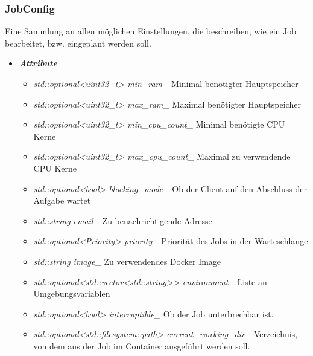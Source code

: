 \documentclass[a4paper,12pt]{article}
\begin{document}
\subsubsection{JobConfig}

Eine Sammlung an allen möglichen Einstellungen, die beschreiben, wie ein Job bearbeitet, bzw. eingeplant werden soll.

\begin{itemize}[label={}]

	\item \textit{\textbf{Attribute}}
		\begin{itemize}[label={\textbullet}]
			\item \textit{std::optional<uint32\_t> min\_ram\_} Minimal benötigter Hauptspeicher
			\item \textit{std::optional<uint32\_t> max\_ram\_} Maximal benötigter Hauptspeicher
			\item \textit{std::optional<uint32\_t> min\_cpu\_count\_} Minimal benötigte CPU Kerne
			\item \textit{std::optional<uint32\_t> max\_cpu\_count\_} Maximal zu verwendende CPU Kerne
			\item \textit{std::optional<bool> blocking\_mode\_} Ob der Client auf den Abschluss der Aufgabe wartet
			\item \textit{std::string email\_} Zu benachrichtigende Adresse
			\item \textit{std::optional<Priority> priority\_} Priorität des Jobs in der Warteschlange
			\item \textit{std::string image\_} Zu verwendendes Docker Image
			\item \textit{std::optional<std::vector<std::string>> environment\_} Liste an Umgebungsvariablen
			\item \textit{std::optional<bool> interruptible\_} Ob der Job unterbrechbar ist.
			\item \textit{std::optional<std::filesystem::path> current\_working\_dir\_} Verzeichnis, von dem aus der Job im Container ausgeführt werden soll.
		\end{itemize}


\end{itemize}
\end{document}
